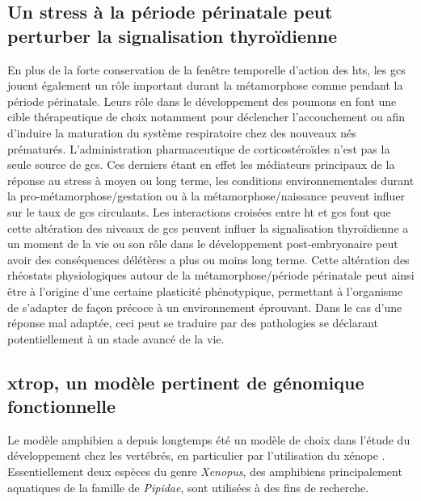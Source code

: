 \subsection{Un stress à la période périnatale peut perturber la signalisation thyroïdienne}
En plus de la forte conservation de la fenêtre temporelle d'action des \glspl{ht}, les \glspl{gc} jouent également un rôle important durant la métamorphose comme pendant la période périnatale.
Leurs rôle dans le développement des poumons en font une cible thérapeutique de choix notamment pour déclencher l'accouchement ou afin d'induire la maturation du système respiratoire chez des nouveaux nés prématurés.
L'administration pharmaceutique de corticostéroïdes n'est pas la seule source de \glspl{gc}.
Ces derniers étant en effet les médiateurs principaux de la réponse au stress à moyen ou long terme, les conditions environnementales durant la pro-métamorphose/gestation ou à la métamorphose/naissance peuvent influer sur le taux de \glspl{gc} circulants.
Les interactions croisées entre \gls{ht} et \glspl{gc} font que cette altération des niveaux de \glspl{gc} peuvent influer la signalisation thyroïdienne a un moment de la vie ou son rôle dans le développement post-embryonaire peut avoir des conséquences délétères a plus ou moins long terme.
Cette altération des rhéostats physiologiques autour de la métamorphose/période périnatale peut ainsi être à l'origine d'une certaine plasticité phénotypique, permettant à l'organisme de s'adapter de façon précoce à un environnement éprouvant.
Dans le cas d'une réponse mal adaptée, ceci peut se traduire par des pathologies se déclarant potentiellement à un stade avancé de la vie.


\subsection{\gls{xtrop}, un modèle pertinent de génomique fonctionnelle}\label{subsec:xtrop-model}
Le modèle amphibien a depuis longtemps été un modèle de choix dans l'étude du développement chez les vertébrés, en particulier par l'utilisation du xénope \citep{Harland2011}.
Essentiellement deux espèces du genre \textit{Xenopus}, des amphibiens principalement aquatiques de la famille de \textit{Pipidae}, sont utilisées à des fins de recherche.

